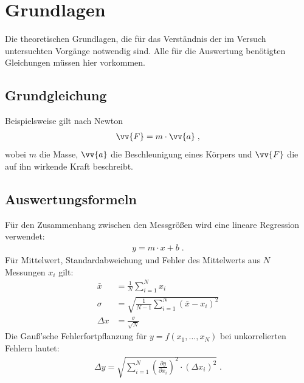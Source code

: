 \section{Grundlagen}
\label{cap:Grundlagen}

Die theoretischen Grundlagen, die für das Verständnis der im Versuch untersuchten Vorgänge notwendig sind. Alle für die Auswertung benötigten Gleichungen müssen hier vorkommen.

\subsection{Grundgleichung}
\label{cap:Grundgleichung}
Beispielsweise gilt nach Newton
\begin{align}
    \vv{F} = m \cdot \vv{a}\;,
    \label{equ:Newton}
\end{align}
wobei $m$ die Masse, $\vv{a}$ die Beschleunigung eines Körpers und $\vv{F}$ die auf ihn wirkende Kraft beschreibt.

\subsection{Auswertungsformeln}
\label{cap:Auswertungsformeln}
Für den Zusammenhang zwischen den Messgrößen wird eine lineare Regression verwendet:
\begin{align}
    y = m \cdot x + b\;.
    \label{equ:Gerade}
\end{align}
Für Mittelwert, Standardabweichung und Fehler des Mittelwerts aus $N$ Messungen $x_i$ gilt:
\begin{align}
    \bar{x} &= \frac{1}{N} \sum_{i=1}^{N} x_i
    \label{equ:Mittelwert}\\
    \sigma &= \sqrt{\frac{1}{N-1} \sum_{i=1}^{N} \left(\bar{x} - x_i\right)^2}
    \label{equ:Standardabweichung}\\
    \Delta x &= \frac{\sigma}{\sqrt{N}}
    \label{equ:FehlerMittelwert}
\end{align}
Die Gauß'sche Fehlerfortpflanzung für $y = f(x_1, \dots, x_N)$ bei unkorrelierten Fehlern lautet:
\begin{align}
    \Delta y = \sqrt{\sum_{i=1}^{N}
    \left(\frac{\partial y}{\partial x_i}\right)^2 \cdot \left(\Delta x_i\right)^2}\;.
    \label{equ:Fehlerfortpflanzung}
\end{align}
